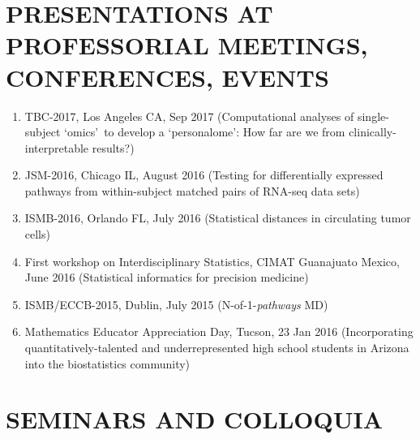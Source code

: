 \documentclass[paper=a4,fontsize=11pt]{scrartcl} %
\newcommand{\NewPart}[2]{\section*{\uppercase{#1} #2 }}
\newcommand{\TalkEntry}[4]{
		\noindent #1, #2, #3 #4}
\begin{document}
\NewPart{Presentations at professorial meetings, conferences, events}{}
\vspace{-7pt}
\begin{enumerate}

  \item\TalkEntry{TBC-2017}{Los Angeles CA}{Sep 2017}{(Computational analyses of single-subject \lq omics\rq~to develop a \lq personalome\rq: How far are we from clinically-interpretable results?)}

\item\TalkEntry{JSM-2016}{Chicago IL}{August 2016}{(Testing for differentially expressed pathways from within-subject matched pairs of RNA-seq data sets)}
\item\TalkEntry{ISMB-2016}{Orlando FL}{July 2016}{(Statistical distances in circulating tumor cells)}
\item\TalkEntry{First workshop on Interdisciplinary Statistics}{CIMAT Guanajuato Mexico}{June 2016}{(Statistical informatics for precision medicine)} 
\item\TalkEntry{ISMB/ECCB-2015}{Dublin}{July 2015}{(N-of-1-\textit{pathways} MD)} 
\item\TalkEntry{2016 Mathematics Educator Appreciation Day}{Tucson}{23 Jan 2016}{(Incorporating quantitatively-talented and underrepresented high school students in Arizona into the biostatistics community)} 
\vspace{-7pt}
\end{enumerate}

\NewPart{Seminars and Colloquia}{}
\end{document}

